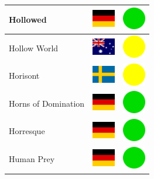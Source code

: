 \documentclass[12pt, a4paper, twoside]{report}
\begin{document}
\begin{center}
\begin{longtable}{|p{5cm}|p{2cm}|p{2cm}|}
Hollowed & \includegraphics[width=1cm]{4x3/de} & \includegraphics[width=1cm]{likes/y} \\ \hline
Hollow World & \includegraphics[width=1cm]{4x3/au} & \includegraphics[width=1cm]{likes/m} \\ \hline
Horisont & \includegraphics[width=1cm]{4x3/se} & \includegraphics[width=1cm]{likes/m} \\ \hline
Horns of Domination & \includegraphics[width=1cm]{4x3/de} & \includegraphics[width=1cm]{likes/y} \\ \hline
Horresque & \includegraphics[width=1cm]{4x3/de} & \includegraphics[width=1cm]{likes/y} \\ \hline
Human Prey & \includegraphics[width=1cm]{4x3/de} & \includegraphics[width=1cm]{likes/y} \\ \hline

\end{longtable}
\end{center}
\end{document}
